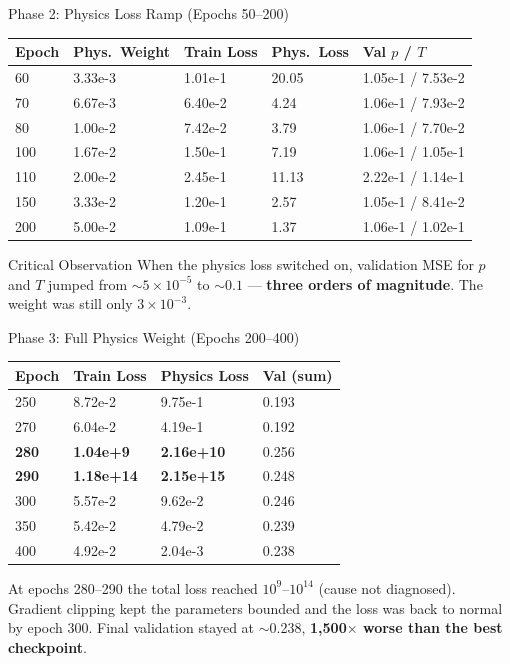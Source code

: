 \documentclass[aspectratio=169]{beamer}
\begin{document}
\begin{frame}{Phase 2: Physics Loss Ramp (Epochs 50--200)}
\begin{table}
\centering
\small
\begin{tabular}{lllll}
\toprule
Epoch & Phys.\ Weight & Train Loss & Phys.\ Loss & Val $p$ / $T$ \\
\midrule
60 & 3.33e-3 & 1.01e-1 & 20.05 & 1.05e-1 / 7.53e-2 \\
70 & 6.67e-3 & 6.40e-2 & 4.24 & 1.06e-1 / 7.93e-2 \\
80 & 1.00e-2 & 7.42e-2 & 3.79 & 1.06e-1 / 7.70e-2 \\
100 & 1.67e-2 & 1.50e-1 & 7.19 & 1.06e-1 / 1.05e-1 \\
110 & 2.00e-2 & 2.45e-1 & 11.13 & 2.22e-1 / 1.14e-1 \\
150 & 3.33e-2 & 1.20e-1 & 2.57 & 1.05e-1 / 8.41e-2 \\
200 & 5.00e-2 & 1.09e-1 & 1.37 & 1.06e-1 / 1.02e-1 \\
\bottomrule
\end{tabular}
\end{table}

\begin{alertblock}{Critical Observation}
When the physics loss switched on, validation MSE for $p$ and $T$ jumped from $\sim5\times10^{-5}$ to $\sim0.1$ --- \textbf{three orders of magnitude}. The weight was still only $3\times10^{-3}$.
\end{alertblock}
\end{frame}

\begin{frame}{Phase 3: Full Physics Weight (Epochs 200--400)}
\begin{table}
\centering
\small
\begin{tabular}{llll}
\toprule
Epoch & Train Loss & Physics Loss & Val (sum) \\
\midrule
250 & 8.72e-2 & 9.75e-1 & 0.193 \\
270 & 6.04e-2 & 4.19e-1 & 0.192 \\
\textbf{280} & \textbf{1.04e+9} & \textbf{2.16e+10} & 0.256 \\
\textbf{290} & \textbf{1.18e+14} & \textbf{2.15e+15} & 0.248 \\
300 & 5.57e-2 & 9.62e-2 & 0.246 \\
350 & 5.42e-2 & 4.79e-2 & 0.239 \\
400 & 4.92e-2 & 2.04e-3 & 0.238 \\
\bottomrule
\end{tabular}
\end{table}

At epochs 280--290 the total loss reached $10^9$--$10^{14}$ (cause not diagnosed). Gradient clipping kept the parameters bounded and the loss was back to normal by epoch 300. Final validation stayed at $\sim$0.238, \textbf{1,500$\times$ worse than the best checkpoint}.
\end{frame}
\end{document}
